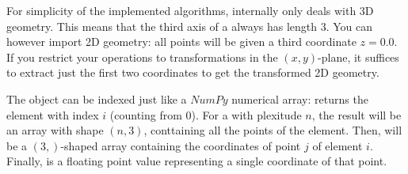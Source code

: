 
For simplicity of the implemented algorithms, internally \pyf only deals with 3D geometry. This means that the third axis of a  always has length 3. You can however import 2D geometry: all points will be given a third coordinate $z=0.0$. If you restrict your operations to transformations in the $(x,y)$-plane, it suffices to extract just the first two coordinates to get the transformed 2D geometry.

The  object  can be indexed just like a $NumPy$ numerical array:  returns the element with index $i$ (counting from $0$). For a  with plexitude $n$, the result will be an array with shape $(n,3)$, conttaining all the points of the element. Then,  will be a $(3,)$-shaped array containing the coordinates of point $j$ of element $i$. Finally,  is a floating point value representing a single coordinate of that point. 







